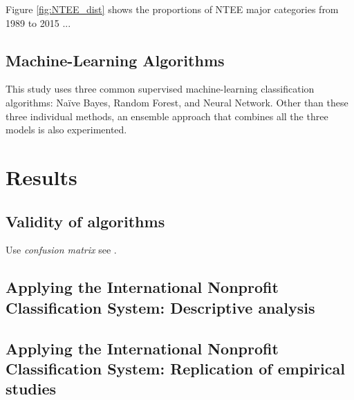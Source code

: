\documentclass[12pt]{article}
\begin{document}
Figure \ref{fig:NTEE_dist} shows the proportions of NTEE major categories from 1989 to 2015 ... 

\subsection{Machine-Learning Algorithms}

This study uses three common supervised machine-learning classification algorithms: Na\"ive Bayes, Random Forest, and Neural Network. Other than these three individual methods, an ensemble approach that combines all the three models is also experimented. 

\section{Results}
\subsection{Validity of algorithms}

Use \textit{confusion matrix} see \textcite[279]{GrimmerTextDataPromise2013}.

\subsection{Applying the International Nonprofit Classification System: Descriptive analysis}

\subsection{Applying the International Nonprofit Classification System: Replication of empirical studies}


\printbibliography
\end{document}
